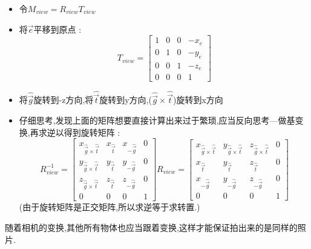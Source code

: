 \documentclass[UTF8,12pt]{ctexbook}
\begin{document}
{{{{{\begin{itemize}
{                \begin{itemize}
                  \item 令$M_{view} = R_{view}T_{view}$
                  \item 将$\vec{e}$平移到原点 : $$
                          T_{view} = \begin{bmatrix}
                            1 & 0 & 0 & -x_e \\
                            0 & 1 & 0 & -y_e \\
                            0 & 0 & 1 & -z_e \\
                            0 & 0 & 0 & 1
                          \end{bmatrix}
                        $$
                  \item 将$\hat{\vec{g}}$旋转到-z方向,将$\hat{\vec{t}}$旋转到y方向,($\hat{\vec{g}} \times \hat{\vec{t}}$)旋转到x方向
                  \item 仔细思考,发现上面的矩阵想要直接计算出来过于繁琐,应当反向思考—做基变换,再求逆以得到旋转矩阵 : $$
                          R^{-1}_{view} = \begin{bmatrix}
                            x_{\hat{\vec{g}} \times \hat{\vec{t}}} & x_{\hat{\vec{t}}} & x_{-\hat{\vec{g}}} & 0 \\
                            y_{\hat{\vec{g}} \times \hat{\vec{t}}} & y_{\hat{\vec{t}}} & y_{-\hat{\vec{g}}} & 0 \\
                            z_{\hat{\vec{g}} \times \hat{\vec{t}}} & z_{\hat{\vec{t}}} & z_{-\hat{\vec{g}}} & 0 \\
                            0                                      & 0                 & 0                  & 1
                          \end{bmatrix}
                          R_{view} = \begin{bmatrix}
                            x_{\hat{\vec{g}} \times \hat{\vec{t}}} & y_{\hat{\vec{g}} \times \hat{\vec{t}}} & z_{\hat{\vec{g}} \times \hat{\vec{t}}} & 0 \\
                            x_{\hat{\vec{t}}}                      & y_{\hat{\vec{t}}}                      & z_{\hat{\vec{t}}}                      & 0 \\
                            x_{-\hat{\vec{g}}}                     & y_{-\hat{\vec{g}}}                     & z_{-\hat{\vec{g}}}                     & 0 \\
                            0                                      & 0                                      & 0                                      & 1
                          \end{bmatrix}
                        $$
                        (由于旋转矩阵是正交矩阵,所以求逆等于求转置.)
                \end{itemize}
                随着相机的变换,其他所有物体也应当跟着变换,这样才能保证拍出来的是同样的照片.
                }


\end{itemize}}}}}}
\end{document}
